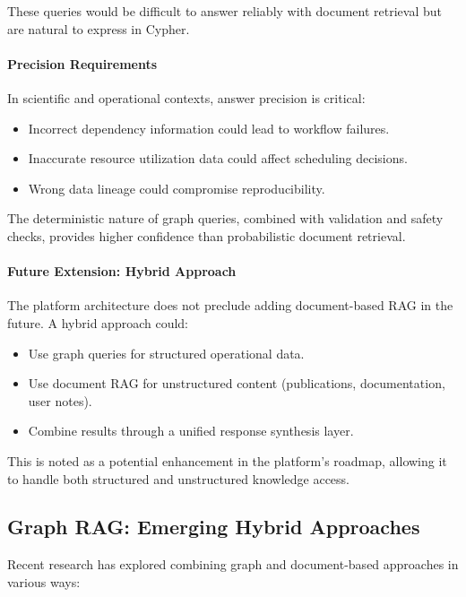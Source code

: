 These queries would be difficult to answer reliably with document retrieval but are natural to express in Cypher.

\paragraph{Precision Requirements}

In scientific and operational contexts, answer precision is critical:

\begin{itemize}
    \item Incorrect dependency information could lead to workflow failures.
    \item Inaccurate resource utilization data could affect scheduling decisions.
    \item Wrong data lineage could compromise reproducibility.
\end{itemize}

The deterministic nature of graph queries, combined with validation and safety checks, provides higher confidence than probabilistic document retrieval.

\paragraph{Future Extension: Hybrid Approach}

The platform architecture does not preclude adding document-based RAG in the future. A hybrid approach could:

\begin{itemize}
    \item Use graph queries for structured operational data.
    \item Use document RAG for unstructured content (publications, documentation, user notes).
    \item Combine results through a unified response synthesis layer.
\end{itemize}

This is noted as a potential enhancement in the platform's roadmap, allowing it to handle both structured and unstructured knowledge access.

\subsection{Graph RAG: Emerging Hybrid Approaches}

Recent research has explored combining graph and document-based approaches in various ways:

